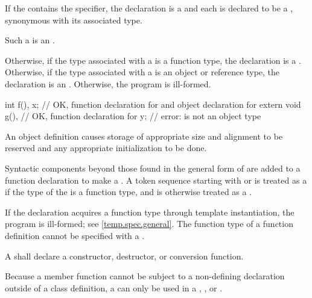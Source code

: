 \pnum
If the  contains the 
specifier, the declaration is a 
and each 
is declared to be a , synonymous with its
associated type.
\begin{note}
Such a  is
an .
\end{note}
Otherwise, if the type associated with a 
is a function type,
the declaration is a .
Otherwise, if the type associated with a 
is an object or reference type, the declaration is
an .
Otherwise, the program is ill-formed.
\begin{example}
\begin{codeblock}
int f(), x;             // OK, function declaration for  and object declaration for 
extern void g(),        // OK, function declaration for 
  y;                    // error:  is not an object type
\end{codeblock}
\end{example}

\pnum
{}%
An object definition causes
storage of appropriate size and alignment to be reserved and
any appropriate initialization to be done.

\pnum
{}%
Syntactic components beyond those found in the general form of
 are added to a function declaration to make a
.
A token sequence starting with \tcode{\{} or \tcode{=}
is treated as a 
if the type of the 
is a function type, and
is otherwise
treated as a .
\begin{note}
If the declaration acquires a function type through template instantiation,
the program is ill-formed; see \ref{temp.spec.general}.
The function type of a function definition
cannot be specified with a .
\end{note}

\pnum
A  shall declare a
constructor, destructor, or conversion function.
\begin{note}
Because a member function cannot be subject to a non-defining declaration
outside of a class definition, a 
can only be used in a ,
, or
.
\end{note}

